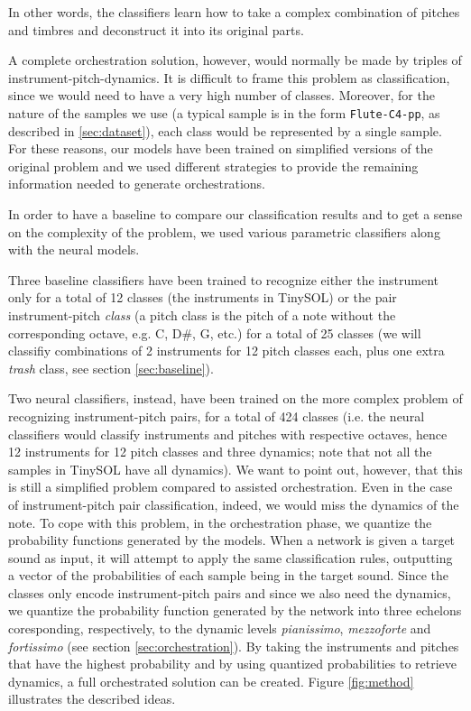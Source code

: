 \documentclass[runningheads,a4paper]{llncs}
\begin{document}
In other words, the classifiers learn how to take a complex combination of pitches and timbres and deconstruct it into its original parts.

A complete orchestration solution, however, would normally be made by triples of instrument-pitch-dynamics. It is difficult to frame this problem as classification, since we would need to have a very high number of classes. Moreover, for the nature of the samples we use (a typical sample is in the form \texttt{Flute-C4-pp}, as described in \ref{sec:dataset}), each class would be represented by a single sample. For these reasons, our models have been trained on simplified versions of the original problem and we used different strategies to provide the remaining information needed to generate orchestrations.

In order to have a baseline to compare our classification results and to get a sense on the complexity of the problem, we used various parametric classifiers along with the neural models.

Three baseline classifiers have been trained to recognize either the instrument only for a total of 12 classes (the instruments in TinySOL) or the pair instrument-pitch \emph{class} (a pitch class is the pitch of a note without the corresponding octave, e.g. C, D\#, G, etc.) for a total of 25 classes (we will classifiy combinations of 2 instruments for 12 pitch classes each, plus one extra \emph{trash} class, see section \ref{sec:baseline}).

Two neural classifiers, instead, have been trained on the more complex problem of recognizing instrument-pitch pairs, for a total of 424 classes (i.e. the neural classifiers would classify instruments and pitches with respective octaves, hence 12 instruments for 12 pitch classes and three dynamics; note that not all the samples in TinySOL have all dynamics). We want to point out, however, that this is still a simplified problem compared to assisted orchestration. Even in the case of instrument-pitch pair classification, indeed, we would miss the dynamics of the note. To cope with this problem, in the orchestration phase, we quantize the probability functions generated by the models. When a network is given a target sound as input, it will attempt to apply the same classification rules, outputting a vector of the probabilities of each sample being in the target sound. Since the classes only encode instrument-pitch pairs and since we also need the dynamics, we quantize the probability function generated by the network into three echelons coresponding, respectively, to the dynamic levels \emph{pianissimo}, \emph{mezzoforte} and \emph{fortissimo} (see section \ref{sec:orchestration}). By taking the instruments and pitches that have the highest probability and by using quantized probabilities to retrieve dynamics, a full orchestrated solution can be created.  Figure \ref{fig:method} illustrates the described ideas.
\end{document}
